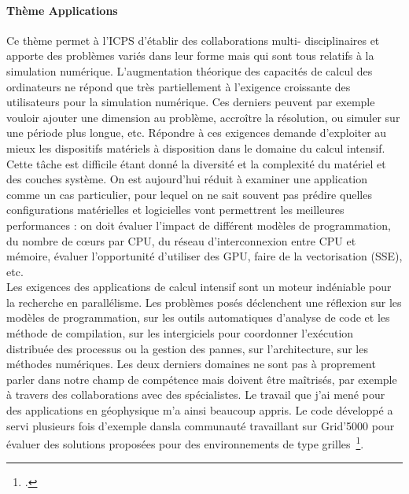\documentclass[11pt]{article}
\begin{document}
\paragraph{Thème Applications}
Ce thème permet  à l'ICPS d'établir des collaborations  multi- disciplinaires et
apporte des problèmes  variés dans leur forme  mais qui sont tous  relatifs à la
simulation  numérique.  L'augmentation  théorique  des capacités  de calcul  des
ordinateurs  ne  répond  que  très partiellement  à  l'exigence  croissante  des
utilisateurs pour  la simulation  numérique.  Ces  derniers peuvent  par exemple
vouloir ajouter une  dimension au problème, accroître la  résolution, ou simuler
sur une période plus longue, etc.   Répondre à ces exigences demande d'exploiter
au  mieux les  dispositifs matériels  à disposition  dans le  domaine du  calcul
intensif.  Cette tâche  est difficile étant donné la diversité  et la complexité
du matériel  et des couches système.   On est aujourd'hui réduit  à examiner une
application comme un cas particulier, pour lequel on ne sait souvent pas prédire
quelles  configurations   matérielles  et   logicielles  vont   permettrent  les
meilleures  performances :  on doit  évaluer  l'impact de  différent modèles  de
programmation, du nombre de c{\oe}urs  par CPU, du réseau d'interconnexion entre
CPU  et  mémoire,  évaluer  l'opportunité   d'utiliser  des  GPU,  faire  de  la
vectorisation (SSE), etc.\\

Les exigences des applications de calcul intensif sont un moteur indéniable pour
la recherche en parallélisme. Les  problèmes posés déclenchent une réflexion sur
les modèles de  programmation, sur les outils automatiques d'analyse  de code et
les méthode  de compilation,  sur les  intergiciels pour  coordonner l'exécution
distribuée des processus  ou la gestion des pannes, sur  l'architecture, sur les
méthodes numériques. Les deux derniers domaines  ne sont pas à proprement parler
dans  notre champ  de  compétence mais  doivent être  maîtrisés,  par exemple  à
travers des collaborations avec des spécialistes.  Le travail que j'ai mené pour
des applications en  géophysique m'a ainsi beaucoup appris. Le  code développé a
servi plusieurs fois d'exemple dansla  communauté travaillant sur Grid'5000 pour
évaluer   des   solutions   proposées    pour   des   environnements   de   type
grilles~\footcite{Cappello07}.  \\
\end{document}
